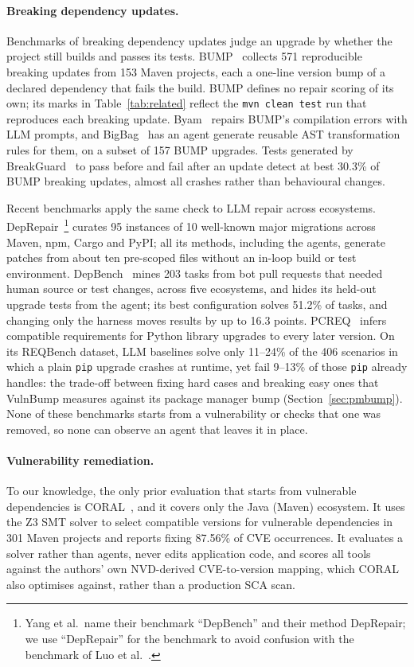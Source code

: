 \documentclass[11pt]{article}
\theoremstyle{definition}
\newcommand{\bench}{VulnBump}
\newcommand{\pmbump}{package manager bump}
\begin{document}
\paragraph{Breaking dependency updates.}
Benchmarks of breaking dependency updates judge an upgrade by whether the project still builds and passes its tests. BUMP~\cite{reyes2024bump} collects 571 reproducible breaking updates from 153 Maven projects, each a one-line version bump of a declared dependency that fails the build. BUMP defines no repair scoring of its own; its marks in Table~\ref{tab:related} reflect the \texttt{mvn clean test} run that reproduces each breaking update. Byam~\cite{reyes2025byam} repairs BUMP's compilation errors with LLM prompts, and BigBag~\cite{reyes2026bigbag} has an agent generate reusable AST transformation rules for them, on a subset of 157 BUMP upgrades. Tests generated by BreakGuard~\cite{raj2026breakguard} to pass before and fail after an update detect at best 30.3\% of BUMP breaking updates, almost all crashes rather than behavioural changes.

Recent benchmarks apply the same check to LLM repair across ecosystems. DepRepair~\cite{yang2026deprepair}\footnote{Yang et al.\ name their benchmark ``DepBench'' and their method DepRepair; we use ``DepRepair'' for the benchmark to avoid confusion with the benchmark of Luo et al.~\cite{luo2026depbench}.} curates 95 instances of 10 well-known major migrations across Maven, npm, Cargo and PyPI; all its methods, including the agents, generate patches from about ten pre-scoped files without an in-loop build or test environment. DepBench~\cite{luo2026depbench} mines 203 tasks from bot pull requests that needed human source or test changes, across five ecosystems, and hides its held-out upgrade tests from the agent; its best configuration solves 51.2\% of tasks, and changing only the harness moves results by up to 16.3 points. PCREQ~\cite{lei2025pcreq} infers compatible requirements for Python library upgrades to every later version. On its REQBench dataset, LLM baselines solve only 11--24\% of the 406 scenarios in which a plain \texttt{pip} upgrade crashes at runtime, yet fail 9--13\% of those \texttt{pip} already handles: the trade-off between fixing hard cases and breaking easy ones that \bench{} measures against its \pmbump{} (Section~\ref{sec:pmbump}). None of these benchmarks starts from a vulnerability or checks that one was removed, so none can observe an agent that leaves it in place.

\paragraph{Vulnerability remediation.}
To our knowledge, the only prior evaluation that starts from vulnerable dependencies is CORAL~\cite{zhang2023coral}, and it covers only the Java (Maven) ecosystem. It uses the Z3 SMT solver to select compatible versions for vulnerable dependencies in 301 Maven projects and reports fixing 87.56\% of CVE occurrences. It evaluates a solver rather than agents, never edits application code, and scores all tools against the authors' own NVD-derived CVE-to-version mapping, which CORAL also optimises against, rather than a production SCA scan.
\end{document}

